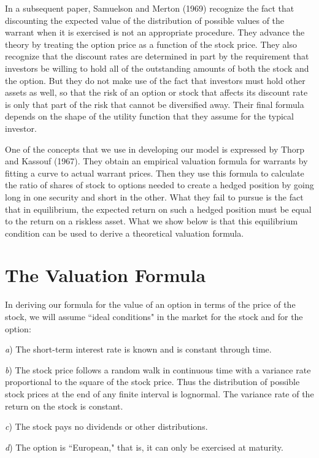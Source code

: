 \documentclass[a4paper, 12pt, twoside]{article}
\begin{document}
In a subsequent paper, Samuelson and Merton (1969) recognize the fact that discounting 
the expected value of the distribution of possible values of the warrant when it is 
exercised is not an appropriate procedure. They advance the theory by treating the 
option price as a function of the stock price. They also recognize that the discount 
rates are determined in part by the requirement that investors be willing to hold all 
of the outstanding amounts of both the stock and the option. But they do not make use 
of the fact that investors must hold other assets as well, so that the risk of an 
option or stock that affects its discount rate is only that part of the risk that 
cannot be diversified away. Their final formula depends on the shape of the utility 
function that they assume for the typical investor.

One of the concepts that we use in developing our model is expressed by Thorp and 
Kassouf (1967). They obtain an empirical valuation formula for warrants by fitting a 
curve to actual warrant prices. Then they use this formula to calculate the ratio of 
shares of stock to options needed to create a hedged position by going long in one 
security and short in the other. What they fail to pursue is the fact that in 
equilibrium, the expected return on such a hedged position must be equal to the return 
on a riskless asset. What we show below is that this equilibrium condition can be used 
to derive a theoretical valuation formula.

\section*{The Valuation Formula}

In deriving our formula for the value of an option in terms of the price of the stock, 
we will assume ``ideal conditions" in the market for the stock and for the option:

\textit{a}) The short-term interest rate is known and is constant through time.

\textit{b}) The stock price follows a random walk in continuous time with a variance rate 
proportional to the square of the stock price. Thus the distribution of possible stock 
prices at the end of any finite interval is lognormal. The variance rate of the return 
on the stock is constant.

\textit{c}) The stock pays no dividends or other distributions.

\textit{d}) The option is ``European," that is, it can only be exercised at maturity.
\end{document}
